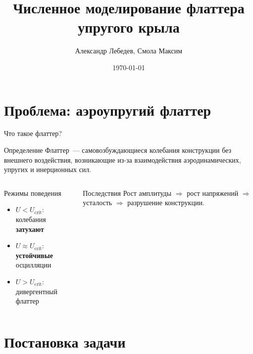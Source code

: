 \documentclass[9pt,aspectratio=169]{beamer}
\title{Численное моделирование флаттера упругого крыла}
\author{Александр Лебедев, Смола Максим}
\institute{Московский физико-технический институт}
\date{\today}
\begin{document}
{
\begin{frame}
  \titlepage
\end{frame}
}

\section{Проблема: аэроупругий флаттер}

\begin{frame}{Что такое флаттер?}
  \begin{block}{Определение}
    Флаттер~--- \alert{самовозбуждающиеся колебания} конструкции
    без внешнего воздействия, возникающие из-за взаимодействия
    аэродинамических, упругих и инерционных сил.
  \end{block}

  \medskip

  \begin{columns}[T]
      \begin{block}{Режимы поведения}
        \begin{itemize}
          \item $U < U_{\mathrm{crit}}$: колебания \textbf{затухают}
          \item $U \approx U_{\mathrm{crit}}$: \textbf{устойчивые} осцилляции
          \item $U > U_{\mathrm{crit}}$: \alert{дивергентный флаттер}
        \end{itemize}
      \end{block}

      \begin{alertblock}{Последствия}
        Рост амплитуды $\Rightarrow$ рост напряжений $\Rightarrow$
        усталость $\Rightarrow$ \alert{разрушение конструкции}.
      \end{alertblock}
  \end{columns}
\end{frame}

\section{Постановка задачи}
\end{document}
